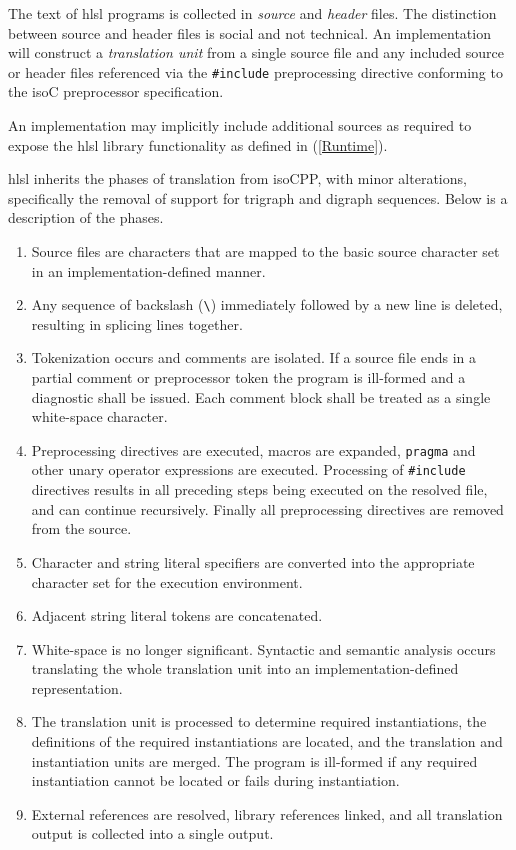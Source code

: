 

\p The text of \acrshort{hlsl} programs is collected in \textit{source} and
\textit{header} files. The distinction between source and header files is social
and not technical. An implementation will construct a \textit{translation unit}
from a single source file and any included source or header files referenced via
the \texttt{\#include} preprocessing directive conforming to the \gls{isoC}
preprocessor specification.

\p An implementation may implicitly include additional sources as required to
expose the \acrshort{hlsl} library functionality as defined in (\ref{Runtime}).


\p \acrshort{hlsl} inherits the phases of translation from \gls{isoCPP}, with
minor alterations, specifically the removal of support for trigraph and digraph
sequences. Below is a description of the phases.

\begin{enumerate}
  \item Source files are characters that are mapped to the basic source
  character set in an implementation-defined manner.
  \item Any sequence of backslash (\texttt{\textbackslash}) immediately followed
  by a new line is deleted, resulting in splicing lines together.
  \item Tokenization occurs and comments are isolated. If a source file ends in
  a partial comment or preprocessor token the program is ill-formed and a
  diagnostic shall be issued. Each comment block shall be treated as a single
  white-space character.
  \item Preprocessing directives are executed, macros are expanded,
  \texttt{pragma} and other unary operator expressions are executed. Processing
  of \texttt{\#include} directives results in all preceding steps being executed
  on the resolved file, and can continue recursively. Finally all preprocessing
  directives are removed from the source.
  \item Character and string literal specifiers are converted into the
  appropriate character set for the execution environment.
  \item Adjacent string literal tokens are concatenated.
  \item White-space is no longer significant. Syntactic and semantic analysis
  occurs translating the whole translation unit into an implementation-defined
  representation.
  \item The translation unit is processed to determine required instantiations,
  the definitions of the required instantiations are located, and the
  translation and instantiation units are merged. The program is ill-formed if
  any required instantiation cannot be located or fails during instantiation.
  \item External references are resolved, library references linked, and all
  translation output is collected into a single output.
\end{enumerate}

